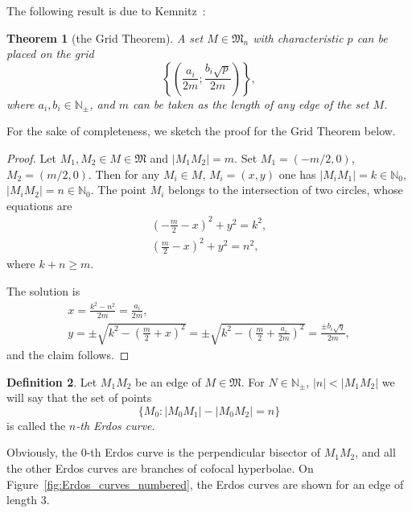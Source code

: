 \documentclass[a4paper,14pt]{article} %
\theoremstyle{plain}
\newtheorem{theorem}{Theorem}[section]
\theoremstyle{definition}
\newtheorem{definition}[theorem]{Definition}
\begin{document}
The following result is due to Kemnitz~\cite{kemnitz1988punktmengen}:

\begin{theorem}[the Grid Theorem]
	A set $M \in \mathfrak{M}_n$ with characteristic $p$ can be placed on the grid
	$$
	\left\{\left(\frac{a_i}{2m} ; \frac{b_i \sqrt{p}}{2m}\right)\right\},
	$$
	where $a_i, b_i \in \mathbb{N}_\pm$, and $m$ can be taken as the length of any edge of the set $M$.
	\label{tm:1}
\end{theorem}

For the sake of completeness, we sketch the proof for the Grid Theorem below.

\begin{proof}
	Let $M_1, M_2 \in M \in \mathfrak M$ and $|M_1 M_2| = m$.
	Set $M_1=(-m/2, 0)$, $M_2=(m/2, 0)$.
	Then for any $M_i \in M$, $M_i = (x,y)$ one has
	$|M_i M_1| = k \in \mathbb N_0$, $|M_i M_2| = n \in \mathbb N_0$.
	The point $M_i$ belongs to the intersection of two circles,
	whose equations are
	\begin{gather}
		\left(-\frac{m}{2} - x\right)^2 + y ^2 = k^2,
	\\
		\left( \frac{m}{2} - x\right)^2 + y ^2 = n^2,
	\end{gather}
	where $k+n\geq m$.

	The solution is
	\begin{gather}
		x = \frac{k^2 - n^2}{2 m} = \frac{a_i}{2m},
	\\
		y = \pm\sqrt{k^2 - \left(\frac{m}{2}+x\right)^2} =
		\pm\sqrt{k^2 - \left(\frac{m}{2}+\frac{a_i}{2m}\right)^2} =
		\frac{\pm b_i \sqrt{q}}{2m},
	\end{gather}
	and the claim follows.
\end{proof}

\begin{definition}
	Let $M_1 M_2$ be an edge of $M\in \mathfrak{M}$.
	For $N\in\mathbb N_\pm$, $|n| < |M_1 M_2|$
	we will say that the set of points
	\begin{equation}
		\{M_0 : |M_0 M_1| - |M_0 M_2| = n\}
	\end{equation}
	is called the \emph{$n$-th Erdos curve}.
\end{definition}

Obviously, the 0-th Erdos curve is the perpendicular bisector of $M_1 M_2$,
and all the other Erdos curves are branches of cofocal hyperbolae.
On Figure~\ref{fig:Erdos_curves_numbered}, the Erdos curves are shown for an edge of length 3.
\end{document}

